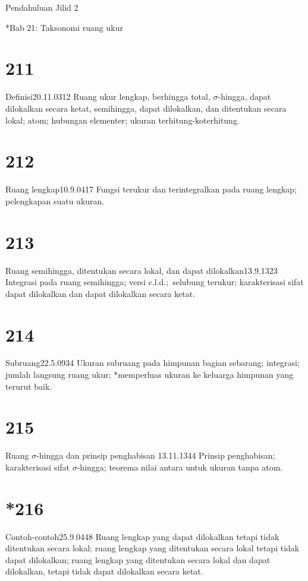 
Pendahuluan Jilid 2 


 *Bab 21: Taksonomi ruang ukur


\section{211}{Definisi}{20.11.03}{12}{}
{Ruang ukur lengkap, berhingga total, $\sigma$-hingga, dapat dilokalkan
secara ketat, semihingga, dapat dilokalkan, dan ditentukan secara lokal;
atom; hubungan elementer; ukuran terhitung-koterhitung.}

\section{212}{Ruang lengkap}{10.9.04}{17}{}
{Fungsi terukur dan terintegralkan pada ruang lengkap;
pelengkapan suatu ukuran.}

\section{213}{Ruang semihingga, ditentukan secara lokal, dan dapat
dilokalkan}{13.9.13}{23}{}
{Integrasi pada ruang semihingga; versi c.l.d.;\ selubung
terukur; karakterisasi sifat dapat dilokalkan dan dapat dilokalkan secara
ketat.}

\section{214}{Subruang}{22.5.09}{34}{}
{Ukuran subruang pada himpunan bagian sebarang; integrasi; jumlah
langsung ruang ukur; *memperluas ukuran ke keluarga himpunan yang
terurut baik.}

\section{215}{Ruang $\sigma$-hingga dan prinsip penghabisan}
{13.11.13}{44}{}
{Prinsip penghabisan; karakterisasi sifat $\sigma$-hingga;
teorema nilai antara untuk ukuran tanpa atom.}

\section{*216}{Contoh-contoh}{25.9.04}{48}{}
{Ruang lengkap yang dapat dilokalkan tetapi tidak ditentukan secara lokal;
ruang lengkap yang ditentukan secara lokal tetapi tidak dapat dilokalkan;
ruang lengkap yang ditentukan secara lokal dan dapat dilokalkan, tetapi
tidak dapat dilokalkan secara ketat.}

